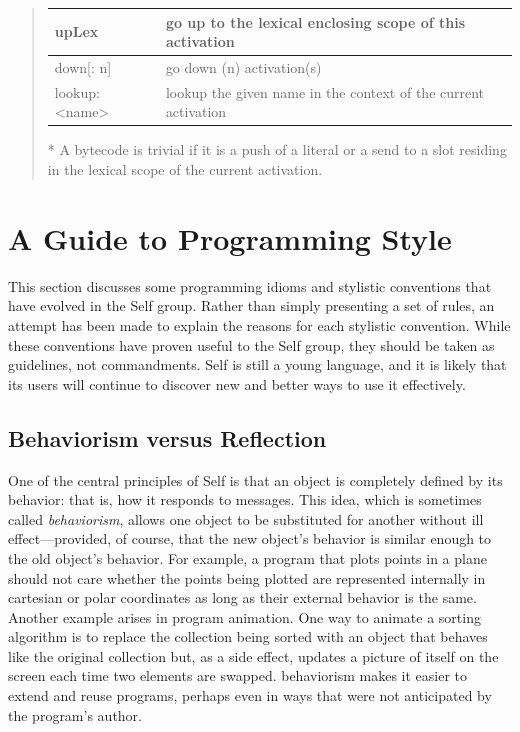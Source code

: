 \documentclass[letterpaper,10pt,english]{sphinxmanual}
\begin{document}
\begin{quote}
\begin{tabulary}{\linewidth}{|L|L|}
upLex
 & 
go up to the lexical enclosing scope of this activation
\\\hline

down{[}: n{]}
 & 
go down (n) activation(s)
\\\hline

lookup: \textless{}name\textgreater{}
 & 
lookup the given name in the context of the current activation
\\\hline
\end{tabulary}


* A bytecode is trivial if it is a push of a literal or a send to a slot residing in
the lexical scope of the current activation.
\end{quote}


\chapter{A Guide to Programming Style}
\label{progguid:a-guide-to-programming-style}\label{progguid::doc}
This section discusses some programming idioms and stylistic conventions that have evolved in the
Self group. Rather than simply presenting a set of rules, an attempt has been made to explain the
reasons for each stylistic convention. While these conventions have proven useful to the Self
group, they should be taken as guidelines, not commandments. Self is still a young language, and
it is likely that its users will continue to discover new and better ways to use it effectively.


\section{Behaviorism versus Reflection}
\label{progguid:behaviorism-versus-reflection}
One of the central principles of Self is that an object is completely defined by its behavior: that
is, how it responds to messages. This idea, which is sometimes called \emph{behaviorism}, allows one object
to be substituted for another without ill effect—provided, of course, that the new object’s behavior
is similar enough to the old object’s behavior. For example, a program that plots points in a
plane should not care whether the points being plotted are represented internally in cartesian or polar
coordinates as long as their external behavior is the same. Another example arises in program
animation. One way to animate a sorting algorithm is to replace the collection being sorted with an
object that behaves like the original collection but, as a side effect, updates a picture of itself on the
screen each time two elements are swapped. behaviorism makes it easier to extend and reuse programs,
perhaps even in ways that were not anticipated by the program’s author.
\end{document}
